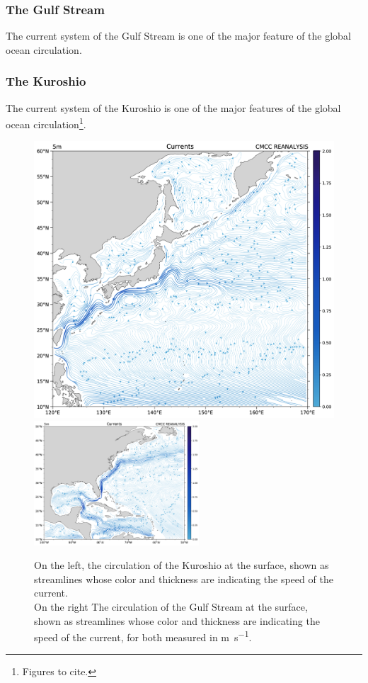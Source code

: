\subsubsection{The Gulf Stream}\label{subsubsec:the-gulf-stream}

The current system of the Gulf Stream is one of the major feature of the
global ocean circulation.


\subsubsection{The Kuroshio}\label{subsubsec:the-kuroshio}

The current system of the Kuroshio is one of the major features of the
global ocean circulation\footnote{Figures to cite.}.


\begin{figure}
	\centering
	\includegraphics[width = 0.44 \textwidth]{figs/kuroshio-surface-circulation}
	\hfill
	\includegraphics[width = 0.55\textwidth]{figs/gulf-stream-surface}
	\caption{On the left, the circulation of the Kuroshio at the surface, shown as streamlines whose color and thickness are indicating the speed of the current.\\
		On the right The circulation of the Gulf Stream at the surface, shown as streamlines whose color and thickness are indicating the speed of the current, for both measured in
		\unit{\meter \per \second}.}
	\label{fig:kuroshio-surface-circulation-gulf-stream-surface}
\end{figure}

